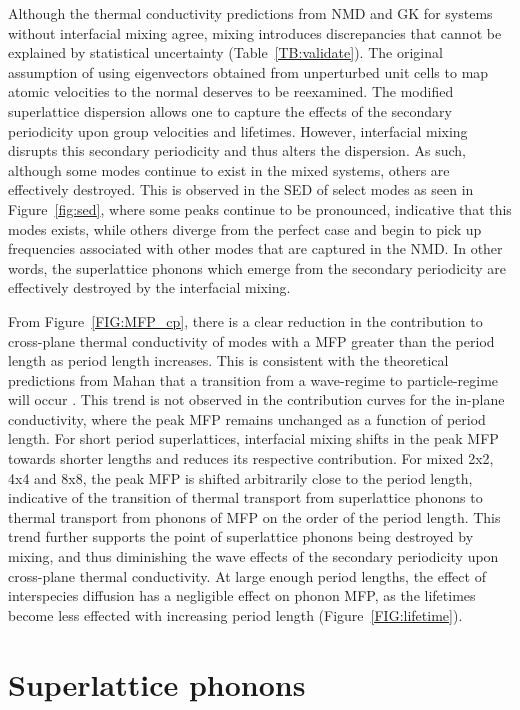 \documentclass[aps,prb,preprint,preprintnumbers,amsmath,amssymb,floatfix,superscriptaddress]{revtex4}
\begin{document}
Although the thermal conductivity predictions from NMD and GK for systems without interfacial mixing agree, mixing introduces discrepancies that cannot be explained by statistical uncertainty (Table~\ref{TB:validate}). The original assumption of using eigenvectors obtained from unperturbed unit cells to map atomic velocities to the normal deserves to be reexamined. The modified superlattice dispersion allows one to capture the effects of the secondary periodicity upon group velocities and lifetimes. However, interfacial mixing disrupts this secondary periodicity and thus alters the dispersion. As such, although some modes continue to exist in the mixed systems, others are effectively destroyed. This is observed in the SED of select modes as seen in Figure~\ref{fig:sed}, where some peaks continue to be pronounced, indicative that this modes exists, while others diverge from the perfect case and begin to pick up frequencies associated with other modes that are captured in the NMD.  In other words, the superlattice phonons which emerge from the secondary periodicity are effectively destroyed by the interfacial mixing. 

From Figure~\ref{FIG:MFP_cp}, there is a clear reduction in the contribution to cross-plane thermal conductivity of modes with a MFP greater than the period length as period length increases. This is consistent with the theoretical predictions from Mahan that a transition from a wave-regime to particle-regime will occur \cite{PhysRevLett.84.927,PhysRevB.56.10754}. This trend is not observed in the contribution curves for the in-plane conductivity, where the peak MFP remains unchanged as a function of period length. For short period superlattices, interfacial mixing shifts in the peak MFP towards shorter lengths and reduces its respective contribution. For mixed 2x2, 4x4 and 8x8, the peak MFP is shifted arbitrarily close to the period length, indicative of the transition of thermal transport from superlattice phonons to thermal transport from phonons of MFP on the order of the period length. This trend further supports the point of superlattice phonons being destroyed by mixing, and thus diminishing the wave effects of the secondary periodicity upon cross-plane thermal conductivity. At large enough period lengths, the effect of interspecies diffusion has a negligible effect on phonon MFP, as the lifetimes become less effected with increasing period length (Figure~\ref{FIG:lifetime}). 

\section{Superlattice phonons}
\end{document}
